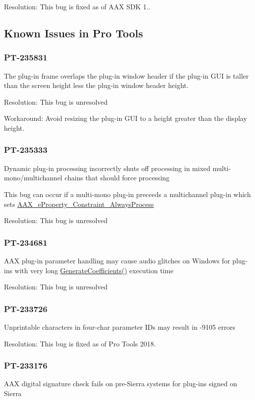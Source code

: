 Resolution\+: This bug is fixed as of A\+A\+X S\+D\+K 1..\hypertarget{a00374_knownissues_ptsw}{}\subsection{Known Issues in Pro Tools}\label{a00374_knownissues_ptsw}
\hypertarget{a00374_PT-235831}{}\subsubsection{P\+T-\/235831}\label{a00374_PT-235831}
The plug-\/in frame overlaps the plug-\/in window header if the plug-\/in G\+U\+I is taller than the screen height less the plug-\/in window header height.

Resolution\+: This bug is unresolved

Workaround\+: Avoid resizing the plug-\/in G\+U\+I to a height greater than the display height.\hypertarget{a00374_PT-235333}{}\subsubsection{P\+T-\/235333}\label{a00374_PT-235333}
Dynamic plug-\/in processing incorrectly shuts off processing in mixed multi-\/mono/multichannel chains that should force processing

This bug can occur if a multi-\/mono plug-\/in preceeds a multichannel plug-\/in which sets \hyperlink{a00283_a6571f4e41a5dd06e4067249228e2249ea510e79713c2f14ebb0a50ed2ab0ff679}{A\+A\+X\+\_\+e\+Property\+\_\+\+Constraint\+\_\+\+Always\+Process}

Resolution\+: This bug is unresolved\hypertarget{a00374_PT-234681}{}\subsubsection{P\+T-\/234681}\label{a00374_PT-234681}
A\+A\+X plug-\/in parameter handling may cause audio glitches on Windows for plug-\/ins with very long \hyperlink{a00061_a083265b008921b6114ede387711694b7}{Generate\+Coefficients()} execution time

Resolution\+: This bug is unresolved\hypertarget{a00374_PT-233726}{}\subsubsection{P\+T-\/233726}\label{a00374_PT-233726}
Unprintable characters in four-\/char parameter I\+Ds may result in -\/9105 errors

Resolution\+: This bug is fixed as of Pro Tools 2018.\hypertarget{a00374_PT-233176}{}\subsubsection{P\+T-\/233176}\label{a00374_PT-233176}
A\+A\+X digital signature check fails on pre-\/\+Sierra systems for plug-\/ins signed on Sierra

